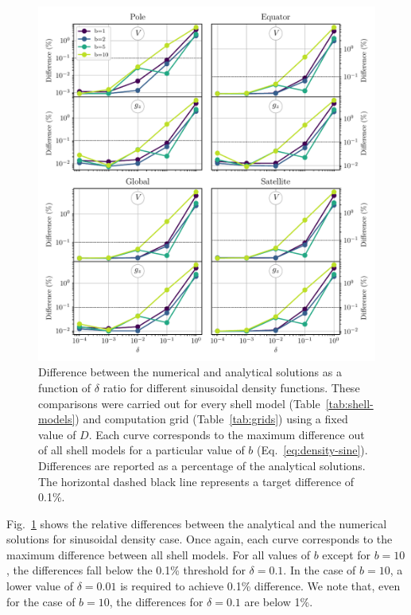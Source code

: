 \documentclass[extra, referee]{gji}
\begin{document}
\begin{figure}
\centering
\includegraphics[width=\linewidth]{figures/sine-density-diffs.pdf}
\caption{
    Difference between the numerical and analytical solutions as a function of $\delta$
    ratio for different sinusoidal density functions.
    These comparisons were carried out for every shell model
    (Table~\ref{tab:shell-models}) and computation grid (Table~\ref{tab:grids})
    using a fixed value of $D$.
    Each curve corresponds to the maximum difference out of all shell models
    for a particular value of $b$ (Eq.~\ref{eq:density-sine}).
    Differences are reported as a percentage of the analytical solutions.
    The horizontal dashed black line represents a target difference of 0.1\%.
    }
\label{fig:delta-sine}
\end{figure}

Fig.~\ref{fig:delta-sine} shows the relative differences between the analytical
and the numerical solutions for sinusoidal density case.
Once again, each curve corresponds to the maximum difference between all shell models.
For all values of $b$ except for $b=10$,
the differences fall below the 0.1\% threshold for $\delta = 0.1$.
In the case of $b=10$, a lower value of $\delta = 0.01$ is required to achieve 0.1\%
difference.
We note that, even for the case of $b=10$, the differences for $\delta = 0.1$ are below
1\%.
\end{document}
